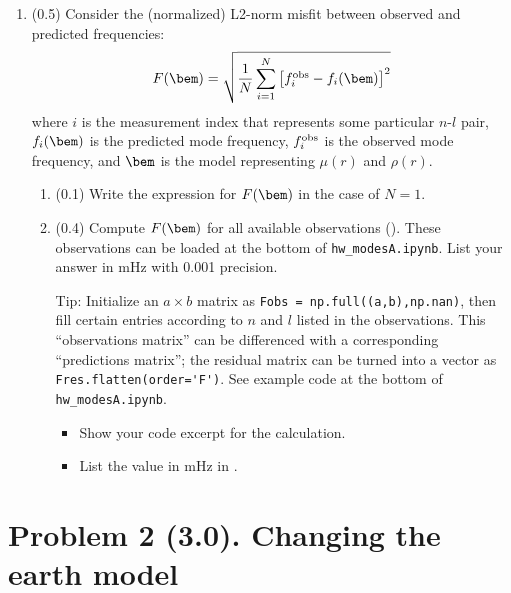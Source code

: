 \documentclass[11pt,titlepage,fleqn]{article}
\newcommand{\tfileA}{{\tt hw\_modesA.ipynb}}
\begin{document}
\begin{enumerate}
\item (0.5) Consider the (normalized) L2-norm misfit between observed and predicted frequencies:
%
\begin{equation}
F(\bem) = \sqrt{ \frac{1}{N} \sum_{i=1}^N \left[f_i^{\rm obs} - f_i(\bem)\right]^2 }
\label{Fm}
\end{equation}
%
where $i$ is the measurement index that represents some particular $n$-$l$ pair, $f_i(\bem)$ is the predicted mode frequency, $f_i^{\rm obs}$ is the observed mode frequency, and $\bem$ is the model representing $\mu(r)$ and $\rho(r)$.

\begin{enumerate}
\item (0.1) Write the expression for $F(\bem)$ in the case of $N=1$.

\item (0.4) Compute $F(\bem)$ for all available observations (). These observations can be loaded at the bottom of \tfileA. List your answer in mHz with 0.001 precision.

Tip: Initialize an $a \times b$ matrix as \verb+Fobs = np.full((a,b),np.nan)+, then fill certain entries according to $n$ and $l$ listed in the observations. This ``observations matrix'' can be differenced with a corresponding ``predictions matrix''; the residual matrix can be turned into a vector as \verb+Fres.flatten(order='F')+. See example code at the bottom of \tfileA.

\begin{itemize}
\item Show your code excerpt for the calculation.
\item List the value in mHz in .
\end{itemize}

\end{enumerate}

\label{prob:Fm}

\end{enumerate}


\section*{Problem 2 (3.0). Changing the earth model}
\end{document}
